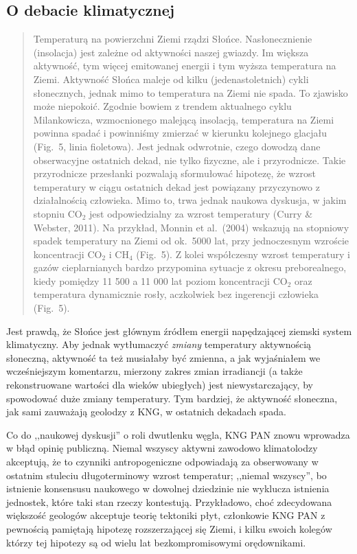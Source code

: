 \documentclass[12pt]{article}
\begin{document}
\newpage

\subsection*{O debacie klimatycznej}

\begin{quotation}
Temperaturą na powierzchni Ziemi rządzi Słońce. Nasłonecznienie (insolacja) jest zależne od aktywności naszej gwiazdy. Im większa aktywność, tym więcej emitowanej energii i tym wyższa temperatura na Ziemi. Aktywność Słońca maleje od kilku (jedenastoletnich) cykli słonecznych, jednak mimo to temperatura na Ziemi nie spada. To zjawisko może niepokoić. Zgodnie bowiem z trendem aktualnego cyklu Milankowicza, wzmocnionego malejącą insolacją, temperatura na Ziemi powinna spadać i powinniśmy zmierzać w kierunku kolejnego glacjału (Fig.~5, linia fioletowa). Jest jednak odwrotnie, czego dowodzą dane obserwacyjne ostatnich dekad, nie tylko fizyczne, ale i przyrodnicze. Takie przyrodnicze przesłanki pozwalają sformułować hipotezę, że wzrost temperatury w ciągu ostatnich dekad jest powiązany przyczynowo z działalnością człowieka. Mimo to, trwa jednak naukowa dyskusja, w jakim stopniu CO$_2$ jest odpowiedzialny za wzrost temperatury (Curry \& Webster, 2011). Na przykład, Monnin et al.~(2004) wskazują na stopniowy spadek temperatury na Ziemi od ok.~5000 lat, przy jednoczesnym wzroście koncentracji CO$_2$ i CH$_4$ (Fig.~5). Z kolei współczesny wzrost temperatury i gazów cieplarnianych bardzo przypomina sytuacje z okresu preborealnego, kiedy pomiędzy 11 500 a 11 000 lat poziom koncentracji CO$_2$ oraz temperatura dynamicznie rosły, aczkolwiek bez ingerencji człowieka (Fig.~5).
\end{quotation}

Jest prawdą, że Słońce jest głównym źródłem energii napędzającej ziemski system klimatyczny. Aby jednak wytłumaczyć \emph{zmiany} temperatury aktywnością słoneczną, aktywność ta też musiałaby być zmienna, a jak wyjaśniałem we wcześniejszym komentarzu, mierzony zakres zmian irradiancji (a także rekonstruowane wartości dla wieków ubiegłych) jest niewystarczający, by spowodować duże zmiany temperatury. Tym bardziej, że aktywność słoneczna, jak sami zauważają geolodzy z KNG, w ostatnich dekadach spada.

Co do ,,naukowej dyskusji'' o roli dwutlenku węgla, KNG PAN znowu wprowadza w błąd opinię publiczną. Niemal wszyscy aktywni zawodowo klimatolodzy akceptują, że to czynniki antropogeniczne odpowiadają za obserwowany w ostatnim stuleciu długoterminowy wzrost temperatur; ,,niemal wszyscy'', bo istnienie konsensusu naukowego w dowolnej dziedzinie nie wyklucza istnienia jednostek, które taki stan rzeczy kontestują. Przykładowo, choć zdecydowana większość geologów akceptuje teorię tektoniki płyt, członkowie KNG PAN z pewnością pamiętają hipotezę rozszerzającej się Ziemi, i kilku swoich kolegów którzy tej hipotezy są od wielu lat bezkompromisowymi orędownikami.
\end{document}
